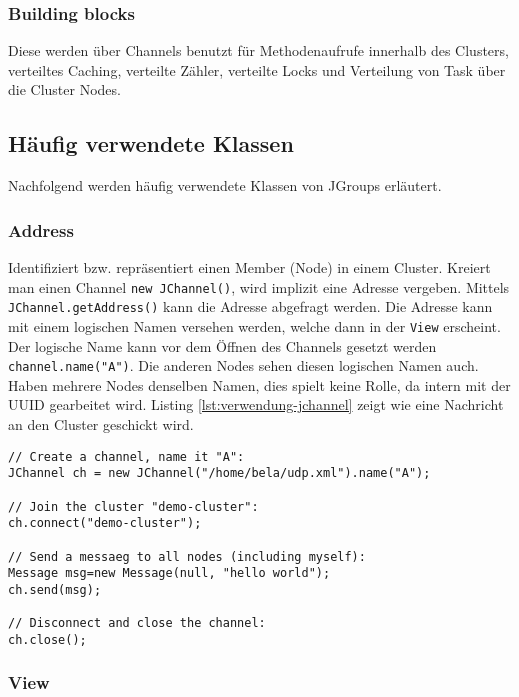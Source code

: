 \subsubsection{Building blocks} 

Diese werden über Channels benutzt für Methodenaufrufe innerhalb des Clusters, verteiltes Caching, verteilte Zähler, verteilte Locks und Verteilung von Task über die Cluster Nodes.

\subsection{Häufig verwendete Klassen}

Nachfolgend werden häufig verwendete Klassen von JGroups erläutert.

\subsubsection{Address} 

Identifiziert bzw. repräsentiert einen Member (Node) in einem Cluster. Kreiert man einen Channel \verb|new JChannel()|, wird implizit eine Adresse vergeben. Mittels \verb|JChannel.getAddress()| kann die Adresse abgefragt werden. Die Adresse kann mit einem logischen Namen versehen werden, welche dann in der \verb|View| erscheint. Der logische Name kann vor dem Öffnen des Channels gesetzt werden \verb|channel.name("A")|. Die anderen Nodes sehen diesen logischen Namen auch. Haben mehrere Nodes denselben Namen, dies spielt keine Rolle, da intern mit der UUID gearbeitet wird. Listing \ref{lst:verwendung-jchannel} zeigt wie eine Nachricht an den Cluster geschickt wird.
	
\begin{lstlisting}[caption=Verwendung von JChannel, label=lst:verwendung-jchannel]
// Create a channel, name it "A":
JChannel ch = new JChannel("/home/bela/udp.xml").name("A");
	
// Join the cluster "demo-cluster":
ch.connect("demo-cluster");
	
// Send a messaeg to all nodes (including myself):
Message msg=new Message(null, "hello world");
ch.send(msg);
	
// Disconnect and close the channel:
ch.close();
\end{lstlisting}
	
\subsubsection{View}

